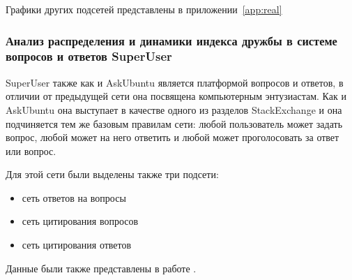 \documentclass[bachelor, och, diploma]{SCWorks}
\begin{document}
Графики других подсетей представлены в приложении~\ref{app:real}

\subsubsection{Анализ распределения и динамики индекса дружбы в системе вопросов и ответов SuperUser}
SuperUser также как и AskUbuntu является платформой вопросов и ответов, в отличии от предыдущей сети она посвящена компьютерным энтузиастам. Как и AskUbuntu она выступает в качестве одного из разделов StackExchange и она подчиняется тем же базовым правилам сети: любой пользователь может задать вопрос, любой может на него ответить и любой может проголосовать за ответ или вопрос.

Для этой сети были выделены также три подсети:
\begin{itemize}
\item сеть ответов на вопросы
\item сеть цитирования вопросов
\item сеть цитирования ответов
\end{itemize}
Данные были также представлены в работе \cite{au}.
\end{document}
